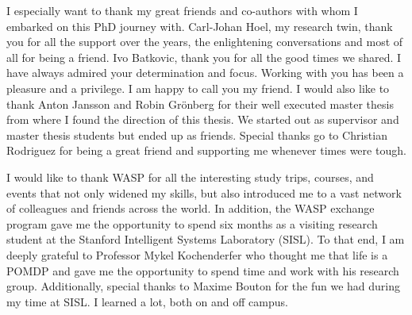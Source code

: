 I especially want to thank my great friends and co-authors with whom I embarked on this PhD journey with. Carl-Johan Hoel, my research twin, thank you for all the support over the years, the enlightening conversations and most of all for being a friend. %
Ivo Batkovic, thank you for all the good times we shared. I have always admired your determination and focus. Working with you has been a pleasure and a privilege. I am happy to call you my friend. 
I would also like to thank Anton Jansson and Robin Gr\"onberg for their well executed master thesis from where I found the direction of this thesis. We started out as supervisor and master thesis students but ended up as friends. 
Special thanks go to Christian Rodriguez for being a great friend and supporting me whenever times were tough.

I would like to thank WASP for all the interesting study trips, courses, and events that not only widened my skills, but also introduced me to a vast network of colleagues and friends across the world. In addition, the WASP exchange program gave me the opportunity to spend six months as a visiting research student at the Stanford Intelligent Systems Laboratory (SISL). To that end, I am deeply grateful to Professor Mykel Kochenderfer who thought me that life is a POMDP and gave me the opportunity to spend time and work with his research group. 
Additionally, special thanks to Maxime Bouton for the fun we had during my time at SISL. I learned a lot, both on and off campus. 



